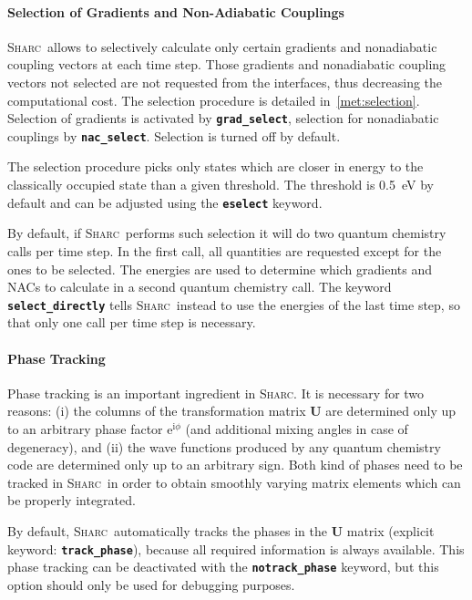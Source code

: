\documentclass[a4paper,10pt,DIV=15,openany,twoside=false]{scrbook}
\newcommand{\sharc}{\textsc{Sharc}}
\newcommand{\ttt}[1]{\textbf{\texttt{#1}}}
\newcommand{\VEC}[1]{\ensuremath{\mathbf{#1}}}
\begin{document}
\paragraph{Selection of Gradients and Non-Adiabatic Couplings}

\sharc\ allows to selectively calculate only certain gradients and nonadiabatic coupling vectors at each time step. Those gradients and nonadiabatic coupling vectors not selected are not requested from the interfaces, thus decreasing the computational cost. The selection procedure is detailed in~\ref{met:selection}.
Selection of gradients is activated by \ttt{grad\_select}, selection for nonadiabatic couplings by \ttt{nac\_select}. Selection is turned off by default. 

The selection procedure picks only states which are closer in energy to the classically occupied state than a given threshold. The threshold is 0.5~eV by default and can be adjusted using the \ttt{eselect} keyword.

By default, if \sharc\ performs such selection it will do two quantum chemistry calls per time step. In the first call, all quantities are requested except for the ones to be selected. The energies are used to determine which gradients and NACs to calculate in a second quantum chemistry call. The keyword \ttt{select\_directly} tells \sharc\ instead to use the energies of the last time step, so that only one call per time step is necessary.

\paragraph{Phase Tracking}

Phase tracking is an important ingredient in \sharc. It is necessary for two reasons: (i) the columns of the transformation matrix $\VEC{U}$ are determined only up to an arbitrary phase factor $\mathrm{e}^{\mathrm{i}\phi}$ (and additional mixing angles in case of degeneracy), and (ii) the wave functions produced by any quantum chemistry code are determined only up to an arbitrary sign.
Both kind of phases need to be tracked in \sharc\ in order to obtain smoothly varying matrix elements which can be properly integrated.

By default, \sharc\ automatically tracks the phases in the $\VEC{U}$ matrix (explicit keyword: \ttt{track\_phase}), because all required information is always available. This phase tracking can be deactivated with the \ttt{notrack\_phase} keyword, but this option should only be used for debugging purposes.
\end{document}
